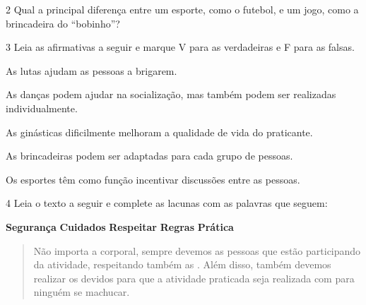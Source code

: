 
\num{2} Qual a principal diferença entre um esporte, como o futebol, e um
  jogo, como a brincadeira do “bobinho”?


\num{3} Leia as afirmativas a seguir e marque V para as verdadeiras e F para
  as falsas.

\begin{boxlist}
 As lutas ajudam as pessoas a brigarem.

 As danças podem ajudar na socialização, mas também podem ser realizadas individualmente.

 As ginásticas dificilmente melhoram a qualidade de vida do praticante.

 As brincadeiras podem ser adaptadas para cada grupo de pessoas.

 Os esportes têm como função incentivar discussões entre as pessoas.
\end{boxlist}


\num{4} Leia o texto a seguir e complete as lacunas com as palavras que seguem:

\begin{mdframed}[linewidth=2pt,linecolor=salmao,backgroundcolor=salmao!20]
\textbf{Segurança}\hfill
\textbf{Cuidados}\hfill
\textbf{Respeitar}\hfill
\textbf{Regras}\hfill
\textbf{Prática}\hfill
\end{mdframed}

\begin{quote}
Não importa a  corporal, sempre devemos  as pessoas que
estão participando da atividade, respeitando também as . Além
disso, também devemos realizar os devidos  para que a atividade
praticada seja realizada com  para ninguém se machucar.
\end{quote}

